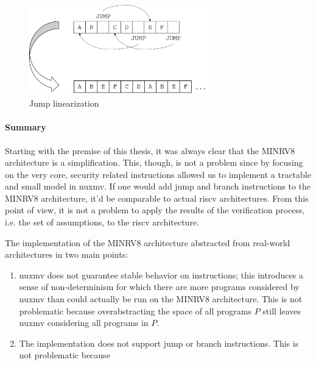 \begin{figure}
    \centering
    \includegraphics[width=0.7\textwidth]{figures/jump-free-programs.png}
    \caption{Jump linearization}
    \label{fig:jump-inlining}
\end{figure}

\paragraph{Summary}


Starting with the premise of this thesis, it was always clear that the MINRV8 architecture is a simplification.
This, though, is not a problem since by focusing on the very core, security related instructions allowed us to implement a tractable and small model in \gls{nuxmv}.
If one would add jump and branch instructions to the MINRV8 architecture, it'd be comparable to actual \gls{riscv} architectures.
From this point of view, it is not a problem to apply the results of the verification process, i.e. the set of assumptions, to the \gls{riscv} architecture.

The implementation of the MINRV8 architecture abstracted from real-world architectures in two main points:
\begin{enumerate}
    \item \gls{nuxmv} does not guarantee stable behavior on  instructions; this introduces a sense of non-determinism for which there are more programs considered by \gls{nuxmv} than could actually be run on the MINRV8 architecture.
    This is not problematic because overabstracting the space of all programs $ P $ still leaves \gls{nuxmv} considering all programs in $ P $.
    \item The implementation does not support jump or branch instructions.
    This is not problematic because
\end{enumerate}


